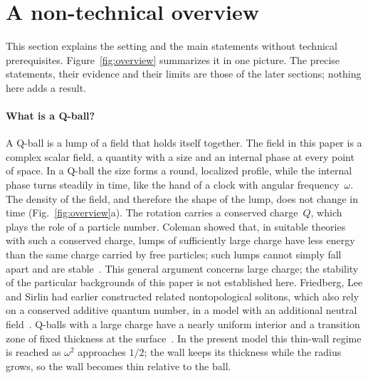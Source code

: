 \section{A non-technical overview}\label{sec:overview}
This section explains the setting and the main statements without
technical prerequisites. Figure~\ref{fig:overview} summarizes it in one
picture. The precise statements, their evidence and their limits are
those of the later sections; nothing here adds a result.

\paragraph{What is a Q-ball?}
A Q-ball is a lump of a field that holds itself together. The field in
this paper is a complex scalar field, a quantity with a size and an
internal phase at every point of space. In a Q-ball the size forms a
round, localized profile, while the internal phase turns steadily in
time, like the hand of a clock with angular frequency~$\omega$. The
density of the field, and therefore the shape of the lump, does not
change in time (Fig.~\ref{fig:overview}a). The rotation carries a
conserved charge~$Q$, which plays the role of a particle number.
Coleman showed that, in suitable theories with such a conserved charge,
lumps of sufficiently large charge have less energy than the same charge
carried by free particles; such lumps cannot simply fall apart and are
stable~\cite{Coleman1985}. This general argument concerns large charge;
the stability of the particular backgrounds of this paper is not
established here. Friedberg, Lee and Sirlin had earlier constructed related
nontopological solitons, which also rely on a conserved additive quantum
number, in a model with an additional neutral
field~\cite{FriedbergLeeSirlin1976}. Q-balls with a large charge have a
nearly uniform interior and a transition zone of fixed thickness at the
surface~\cite{Coleman1985}. In the present model this thin-wall regime
is reached as $\omega^2$ approaches $1/2$; the wall keeps its thickness
while the radius grows, so the wall becomes thin relative to the ball.

